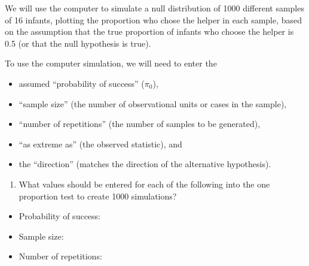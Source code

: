 \documentclass[
]{report}
\providecommand{\tightlist}{%
  \setlength{\itemsep}{0pt}\setlength{\parskip}{0pt}}
\begin{document}
\vspace{1.5in}

We will use the computer to simulate a null distribution of 1000 different samples of 16 infants, plotting the proportion who chose the helper in each sample, based on the assumption that the true proportion of infants who choose the helper is 0.5 (or that the null hypothesis is true).

To use the computer simulation, we will need to enter the

\begin{itemize}
\tightlist
\item
  assumed ``probability of success'' (\(\pi_0\)),
\item
  ``sample size'' (the number of observational units or cases in the sample),
\item
  ``number of repetitions'' (the number of samples to be generated),
\item
  ``as extreme as'' (the observed statistic), and
\item
  the ``direction'' (matches the direction of the alternative hypothesis).
\end{itemize}

\begin{enumerate}
\def\labelenumi{\arabic{enumi}.}
\setcounter{enumi}{17}
\tightlist
\item
  What values should be entered for each of the following into the one proportion test to create 1000 simulations?
\end{enumerate}

\vspace{1mm}

\begin{itemize}
\tightlist
\item
  Probability of success:
\end{itemize}

\vspace{.2in}

\begin{itemize}
\tightlist
\item
  Sample size:
\end{itemize}

\vspace{.2in}

\begin{itemize}
\tightlist
\item
  Number of repetitions:
\end{itemize}

\vspace{.2in}
\end{document}
